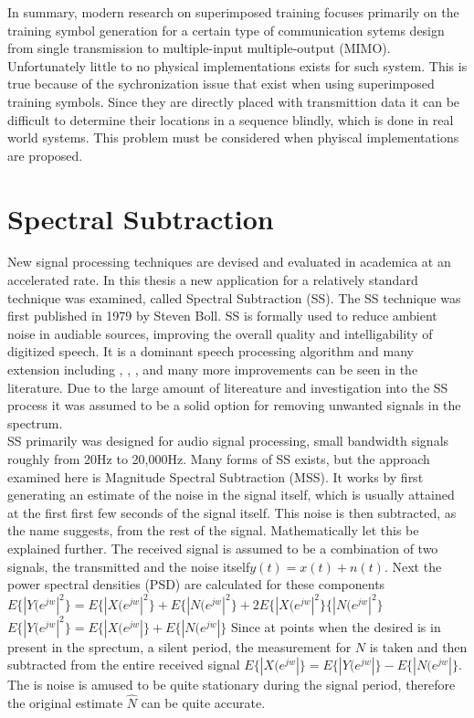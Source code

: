 In summary, modern research on superimposed training focuses primarily on the training symbol generation for a certain type of communication sytems design from single transmission to multiple-input multiple-output (MIMO).  Unfortunately little to no physical implementations exists for such system.  This is true because of the sychronization issue that exist when using superimposed training symbols.  Since they are directly placed with transmittion data it can be difficult to determine their locations in a sequence blindly, which is done in real world systems.  This problem must be considered when phyiscal implementations are proposed.\\

\section{Spectral Subtraction}

New signal processing techniques are devised and evaluated in academica at an accelerated rate\cite{TBD}.  In this thesis a new application for a relatively standard technique was examined, called Spectral Subtraction (SS).  The SS technique was first published in 1979 by Steven Boll\cite{boll}. SS is formally used to reduce ambient noise in audiable sources, improving the overall quality and intelligability of digitized speech.  It is a dominant speech processing algorithm and many extension including \cite{SSEXAMPLE}, \cite{SSEXAMPLE2}, \cite{SSEXAMPLE3}, and many more improvements can be seen in the literature.  Due to the large amount of litereature and investigation into the SS process it was assumed to be a solid option for removing unwanted signals in the spectrum.\\

SS primarily was designed for audio signal processing, small bandwidth signals roughly from 20Hz to 20,000Hz.  Many forms of SS exists, but the approach examined here is Magnitude Spectral Subtraction (MSS).  It works by first generating an estimate of the noise in the signal itself, which is usually attained at the first first few seconds of the signal itself.  This noise is then subtracted, as the name suggests, from the rest of the signal.  Mathematically let this be explained further.  The received signal is assumed to be a combination of two signals, the transmitted and the noise itself\(y(t) = x(t) + n(t)\).  Next the power spectral densities (PSD) are calculated for these components \( E\{|Y(e^{jw}|^{2}\}= E\{|X(e^{jw}|^{2}\} + E\{|N(e^{jw}|^{2}\} + 2E\{|X(e^{jw}|^{2}\}\{|N(e^{jw}|^{2}\}\)
\( E\{|Y(e^{jw}|^{2}\}= E\{|X(e^{jw}|\} + E\{|N(e^{jw}|\}  \)  
Since at points when the desired is in present in the sprectum, a silent period, the measurement for \(N\) is taken and then subtracted from the entire received signal \(E\{|X(e^{jw}|\}= E\{|Y(e^{jw}|\} - E\{|N(e^{jw}|\}\).  The is noise is amused to be quite stationary during the signal period, therefore the original estimate \(\hat{N}\) can be quite accurate.\\

